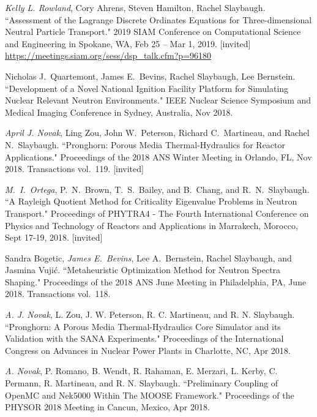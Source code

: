 \begin{bibsection}
\item \textit{Kelly L. Rowland}, Cory Ahrens, Steven Hamilton, Rachel Slaybaugh. ``Assessment of the Lagrange Discrete Ordinates Equations for Three-dimensional Neutral Particle Transport." 2019 SIAM Conference on Computational Science and Engineering in Spokane, WA, Feb 25 – Mar 1, 2019. [invited]\\
\url{https://meetings.siam.org/sess/dsp_talk.cfm?p=96180}

\item Nicholas J.\ Quartemont, James E.\ Bevins, Rachel Slaybaugh, Lee Bernstein. ``Development of a Novel National Ignition Facility Platform for Simulating Nuclear Relevant Neutron Environments." IEEE Nuclear Science Symposium and Medical Imaging Conference in Sydney, Australia, Nov 2018. 

\item \textit{April J. Novak}, Ling Zou, John W.\ Peterson, Richard C.\ Martineau, and Rachel N.\ Slaybaugh. ``Pronghorn: Porous Media Thermal-Hydraulics for Reactor Applications." Proceedings of the 2018 ANS Winter Meeting in Orlando, FL, Nov 2018. Transactions vol.\ 119. [invited]

\item \textit{M.\ I.\ Ortega}, P.\ N.\ Brown, T.\ S.\ Bailey, and B.\ Chang, and R.\ N.\ Slaybaugh. ``A Rayleigh Quotient Method for Criticality Eigenvalue Problems in Neutron Transport." Proceedings of PHYTRA4 - The Fourth International Conference on Physics and Technology of Reactors and Applications in Marrakech, Morocco, Sept 17-19, 2018. [invited]

\item Sandra Bogetic, \textit{James E.\ Bevins}, Lee A.\ Bernstein, Rachel Slaybaugh, and Jasmina Vuji\'c. ``Metaheuristic Optimization Method for Neutron Spectra Shaping." Proceedings of the 2018 ANS June Meeting in Philadelphia, PA, June 2018. Transactions vol.\ 118. 

\item \textit{A. J. Novak}, L. Zou, J. W. Peterson, R. C. Martineau, and R. N. Slaybaugh.
``Pronghorn: A Porous Media Thermal-Hydraulics Core Simulator and its Validation with the SANA Experiments." Proceedings of the International Congress on Advances in Nuclear Power Plants in Charlotte, NC, Apr 2018. 

\item \textit{A. Novak}, P. Romano, B. Wendt, R. Rahaman, E. Merzari, L. Kerby, C. Permann, R. Martineau, and R. N. Slaybaugh. ``Preliminary Coupling of OpenMC and Nek5000 Within The MOOSE Framework." Proceedings of the PHYSOR 2018 Meeting in Cancun, Mexico, Apr 2018. 


\end{bibsection}
